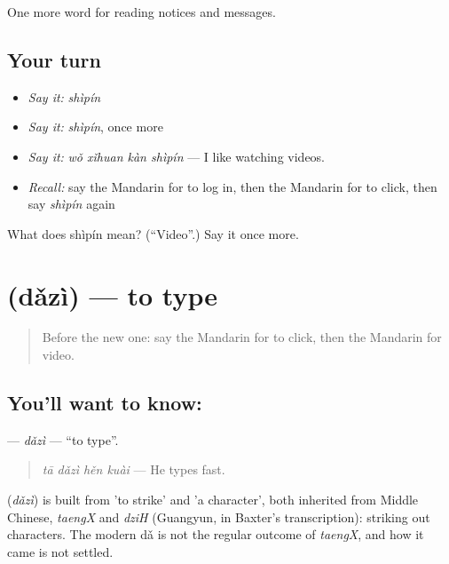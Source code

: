 \begin{grammarlens}[title={What you've built}]
One more word for reading notices and messages.
\end{grammarlens}

\subsection*{Your turn}
\begin{itemize}
\raggedright
  \item \emph{Say it:} \emph{shìpín}
  \item \emph{Say it:} \emph{shìpín}, once more
  \item \emph{Say it:} \emph{wǒ xǐhuan kàn shìpín} — I like watching videos.
  \item \emph{Recall:} say the Mandarin for to log in, then the Mandarin for to click, then say \emph{shìpín} again
\end{itemize}

\begin{tcolorbox}[breakable,colback=teal!4,colframe=teal!35!black,title={Before you move on}]
What does shìpín mean? (\textquotedblleft{}Video\textquotedblright{}.) Say it once more.
\end{tcolorbox}
\section[\texorpdfstring{\zh{打字} (dǎzì)}{打字 (dǎzì)}]{ (dǎzì) — to type}

\label{lesson:ZH-C204-dazi}



\begin{quote}
Before the new one: say the Mandarin for to click, then the Mandarin for video.
\end{quote}

\subsection*{You'll want to know: }
\textbf{} — \emph{dǎzì} — \textquotedblleft{}to type\textquotedblright{}.

\begin{quote}
\textbf{} \emph{tā dǎzì hěn kuài} — He types fast.
\end{quote}

\begin{cousinweb}
\textbf{} (\emph{dǎzì}) is built from  'to strike' and  'a character', both inherited from Middle Chinese, \emph{taengX} and \emph{dziH} (Guangyun, in Baxter's transcription): striking out characters. The modern dǎ is not the regular outcome of \emph{taengX}, and how it came is not settled.
\end{cousinweb}

